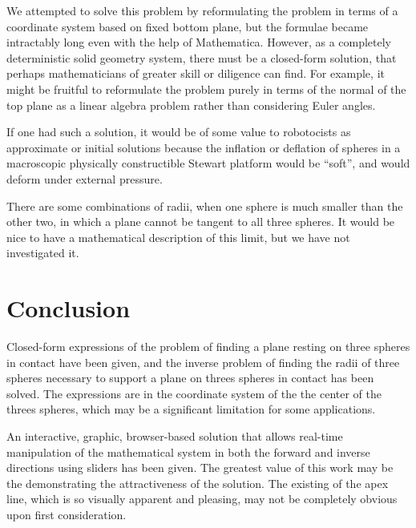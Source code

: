 \documentclass{article}
\begin{document}
We attempted to solve this problem by reformulating the problem in terms
of a coordinate system based on fixed bottom plane, but
the formulae became intractably long even with the help of Mathematica.
However, as a completely deterministic solid geometry system, there
must be a closed-form solution, that perhaps mathematicians of greater
skill or diligence can find.
For example, it might be fruitful to reformulate the problem purely
in terms of the normal of the top plane as a linear algebra problem rather than
considering Euler angles.

If one had such a solution, it would be of some value
to robotocists as approximate or initial
solutions because the inflation or deflation of spheres in
a macroscopic physically constructible Stewart platform would
be ``soft'', and would deform under external pressure.

There are some combinations of radii, when one sphere is much smaller than the
other two, in which a plane cannot be tangent to all three spheres.
It would be nice to have a mathematical description of this limit,
but we have not investigated it.

\section{Conclusion}

Closed-form expressions of the problem of finding a plane resting on
three spheres in contact have been given, and the inverse problem
of finding the radii of three spheres necessary to support a plane
on threes spheres in contact has been solved.
The expressions are in the coordinate system of the the center
of the threes spheres, which may be a significant limitation for some
applications.

An interactive, graphic, browser-based solution that allows real-time manipulation
of the mathematical system in both the forward and inverse directions
using sliders has been given\cite{softrobotcalc}. The greatest value of this work
may be the demonstrating the attractiveness of the solution.
The existing of the apex line, which is so visually apparent and pleasing,
may not be completely obvious upon first consideration.

\printbibliography
\end{document}
